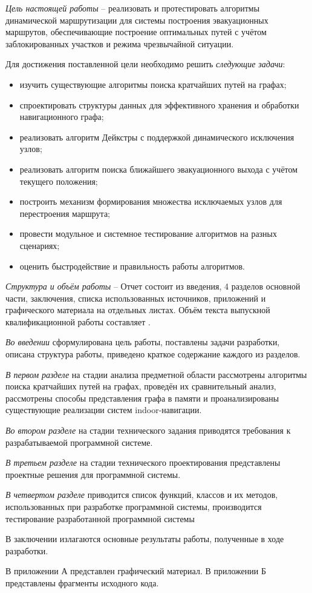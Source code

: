\emph{Цель настоящей работы} -- реализовать и протестировать алгоритмы динамической маршрутизации для системы построения эвакуационных маршрутов, обеспечивающие построение оптимальных путей с учётом заблокированных участков и режима чрезвычайной ситуации.

Для достижения поставленной цели необходимо решить \emph{следующие задачи}:
\begin{itemize}
\item изучить существующие алгоритмы поиска кратчайших путей на графах;
\item спроектировать структуры данных для эффективного хранения и обработки навигационного графа;
\item реализовать алгоритм Дейкстры с поддержкой динамического исключения узлов;
\item реализовать алгоритм поиска ближайшего эвакуационного выхода с учётом текущего положения;
\item построить механизм формирования множества исключаемых узлов для перестроения маршрута;
\item провести модульное и системное тестирование алгоритмов на разных сценариях;
\item оценить быстродействие и правильность работы алгоритмов.
\end{itemize}

\emph{Структура и объём работы} -- Отчет состоит из введения, 4 разделов
основной части, заключения, списка использованных источников, приложений и графического материала на отдельных листах. Объём текста выпускной
квалификационной работы составляет .

\emph{Во введении} сформулирована цель работы, поставлены задачи разработки, описана структура работы, приведено краткое содержание каждого из разделов.

\emph{В первом разделе} на стадии анализа предметной области рассмотрены алгоритмы поиска кратчайших путей на графах, проведён их сравнительный анализ, рассмотрены способы представления графа в памяти и проанализированы существующие реализации систем indoor-навигации.

\emph{Во втором разделе} на стадии технического задания приводятся требования к разрабатываемой программной системе.

\emph{В третьем разделе} на стадии технического проектирования представлены проектные решения для программной системы.

\emph{В четвертом разделе} приводится список функций, классов и их методов, использованных при разработке программной системы, производится тестирование разработанной программной системы

В заключении излагаются основные результаты работы, полученные в ходе разработки.

В приложении А представлен графический материал.
В приложении Б представлены фрагменты исходного кода. 